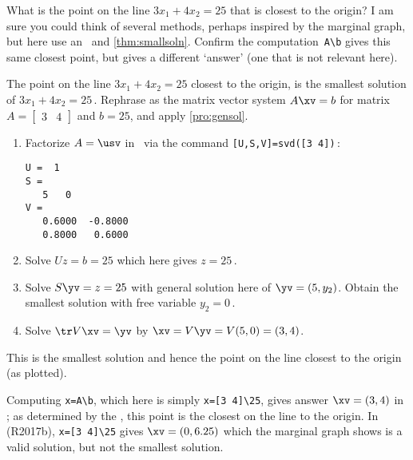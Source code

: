 \begin{reduce}
\begin{example} 
What is the point on the line \(3x_1+4x_2=25\) that is closest to the origin?
I am sure you could think of several methods, perhaps inspired by the marginal graph, but here use an \svd\ and \cref{thm:smallsoln}.
Confirm the \script[2] computation~\verb|A\b| gives this same closest point, but \script[1] gives a different `answer' (one that is not relevant here).
\begin{solution} 
The point on the line \(3x_1+4x_2=25\) closest to the origin, is the smallest solution of \(3x_1+4x_2=25\)\,.  
Rephrase as the matrix vector system \(A\xv=b\) for matrix \(A=\begin{bmatrix} 3&4 \end{bmatrix}\) and \(b=25\), and apply \cref{pro:gensol}.
\begin{enumerate}
\item Factorize \(A=\usv\) in \script\ via the command \verb|[U,S,V]=svd([3 4])|\,:
\begin{verbatim}
U =  1
S =
   5   0
V =
   0.6000  -0.8000
   0.8000   0.6000
\end{verbatim}
\item Solve \(Uz=b=25\) which here gives \(z=25\)\,.
\item Solve \(S\yv=z=25\) with general solution here of \(\yv=(5,y_2)\). 
Obtain the smallest solution with free variable \(y_2=0\)\,.
\item Solve \(\tr V\xv=\yv\) by \(\xv=V\yv=V(5,0)=(3,4)\).  
\end{enumerate}
This is the smallest solution and hence the point on the line closest to the origin (as plotted).

Computing \verb|x=A\b|, which here is simply \verb|x=[3 4]\25|, gives answer \(\xv=(3,4)\) in \script[2]; as determined by the \svd, this point is the closest on the line to the origin.
In \script[1] (R2017b), \verb|x=[3 4]\25| gives \(\xv=(0,6.25)\) which the marginal graph shows is a valid solution, but not the smallest solution.
\end{solution}
\end{example}
\end{reduce}




